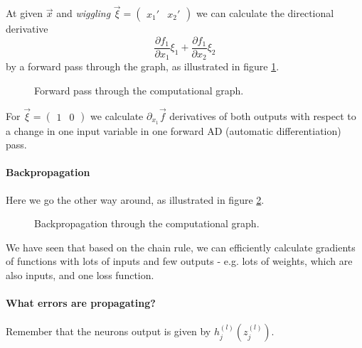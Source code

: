 At given $\vec{x}$ and \textit{wiggling} $\vec{\xi} = \begin{pmatrix}
    x_1' & x_2'
\end{pmatrix}$ we can calculate the directional derivative
\begin{equation}
    \frac{\partial f_1}{\partial x_1} \xi_1 + \frac{\partial f_1}{\partial x_2} \xi_2
\end{equation}
by a forward pass through the graph, as illustrated in figure \ref{fig:comp_graph_dir_deriv}.

\begin{figure}[!htb]
    \centering
    
    \caption{Forward pass through the computational graph.}
    \label{fig:comp_graph_dir_deriv}
\end{figure}

For $\vec{\xi} = \begin{pmatrix}
    1 & 0
\end{pmatrix}$ we calculate $\partial_{x_1} \vec{f}$ derivatives of both outputs with
respect to a change in one input variable in one forward AD (automatic differentiation) pass. 


\paragraph*{Backpropagation} Here we go the other way around, as
illustrated in figure \ref{fig:comp_graph_backprop}.

\begin{figure}[!htb]
    \centering
    
    \caption{Backpropagation through the computational graph.}
    \label{fig:comp_graph_backprop}
\end{figure}

We have seen that based on the chain rule, we can efficiently calculate
gradients of functions with lots of inputs and few outputs - e.g. lots of weights,
which are also inputs, and one loss function.

\paragraph*{What errors are propagating?}
Remember that the neurons output is given by $h_j^{(l)}(z_j^{(l)})$.

